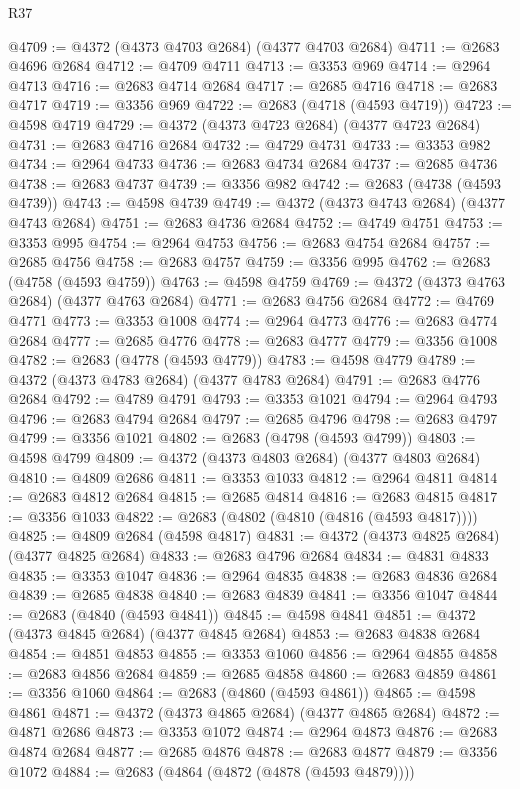\begin{lexlean}{R37}
\begin{coremodule}
@4709 := @4372 (@4373 @4703 @2684) (@4377 @4703 @2684)
@4711 := @2683 @4696 @2684
@4712 := @4709 @4711
@4713 := @3353 @969
@4714 := @2964 @4713
@4716 := @2683 @4714 @2684
@4717 := @2685 @4716
@4718 := @2683 @4717
@4719 := @3356 @969
@4722 := @2683 (@4718 (@4593 @4719))
@4723 := @4598 @4719
@4729 := @4372 (@4373 @4723 @2684) (@4377 @4723 @2684)
@4731 := @2683 @4716 @2684
@4732 := @4729 @4731
@4733 := @3353 @982
@4734 := @2964 @4733
@4736 := @2683 @4734 @2684
@4737 := @2685 @4736
@4738 := @2683 @4737
@4739 := @3356 @982
@4742 := @2683 (@4738 (@4593 @4739))
@4743 := @4598 @4739
@4749 := @4372 (@4373 @4743 @2684) (@4377 @4743 @2684)
@4751 := @2683 @4736 @2684
@4752 := @4749 @4751
@4753 := @3353 @995
@4754 := @2964 @4753
@4756 := @2683 @4754 @2684
@4757 := @2685 @4756
@4758 := @2683 @4757
@4759 := @3356 @995
@4762 := @2683 (@4758 (@4593 @4759))
@4763 := @4598 @4759
@4769 := @4372 (@4373 @4763 @2684) (@4377 @4763 @2684)
@4771 := @2683 @4756 @2684
@4772 := @4769 @4771
@4773 := @3353 @1008
@4774 := @2964 @4773
@4776 := @2683 @4774 @2684
@4777 := @2685 @4776
@4778 := @2683 @4777
@4779 := @3356 @1008
@4782 := @2683 (@4778 (@4593 @4779))
@4783 := @4598 @4779
@4789 := @4372 (@4373 @4783 @2684) (@4377 @4783 @2684)
@4791 := @2683 @4776 @2684
@4792 := @4789 @4791
@4793 := @3353 @1021
@4794 := @2964 @4793
@4796 := @2683 @4794 @2684
@4797 := @2685 @4796
@4798 := @2683 @4797
@4799 := @3356 @1021
@4802 := @2683 (@4798 (@4593 @4799))
@4803 := @4598 @4799
@4809 := @4372 (@4373 @4803 @2684) (@4377 @4803 @2684)
@4810 := @4809 @2686
@4811 := @3353 @1033
@4812 := @2964 @4811
@4814 := @2683 @4812 @2684
@4815 := @2685 @4814
@4816 := @2683 @4815
@4817 := @3356 @1033
@4822 := @2683 (@4802 (@4810 (@4816 (@4593 @4817))))
@4825 := @4809 @2684 (@4598 @4817)
@4831 := @4372 (@4373 @4825 @2684) (@4377 @4825 @2684)
@4833 := @2683 @4796 @2684
@4834 := @4831 @4833
@4835 := @3353 @1047
@4836 := @2964 @4835
@4838 := @2683 @4836 @2684
@4839 := @2685 @4838
@4840 := @2683 @4839
@4841 := @3356 @1047
@4844 := @2683 (@4840 (@4593 @4841))
@4845 := @4598 @4841
@4851 := @4372 (@4373 @4845 @2684) (@4377 @4845 @2684)
@4853 := @2683 @4838 @2684
@4854 := @4851 @4853
@4855 := @3353 @1060
@4856 := @2964 @4855
@4858 := @2683 @4856 @2684
@4859 := @2685 @4858
@4860 := @2683 @4859
@4861 := @3356 @1060
@4864 := @2683 (@4860 (@4593 @4861))
@4865 := @4598 @4861
@4871 := @4372 (@4373 @4865 @2684) (@4377 @4865 @2684)
@4872 := @4871 @2686
@4873 := @3353 @1072
@4874 := @2964 @4873
@4876 := @2683 @4874 @2684
@4877 := @2685 @4876
@4878 := @2683 @4877
@4879 := @3356 @1072
@4884 := @2683 (@4864 (@4872 (@4878 (@4593 @4879))))

\end{coremodule}
\end{lexlean}
